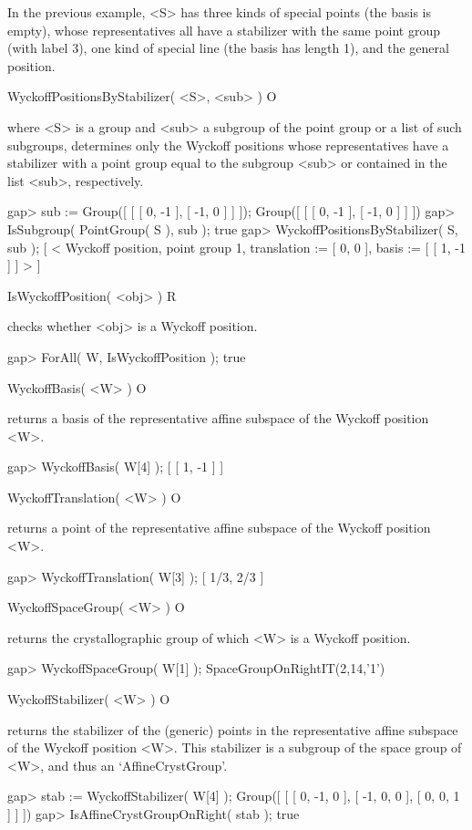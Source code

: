 In the previous example, <S> has three kinds of special points
(the basis is empty), whose representatives all have a stabilizer 
with the same point group (with label 3), one kind of special line
(the basis has length 1), and the general position.

\>WyckoffPositionsByStabilizer( <S>, <sub> ) O

where <S> is a group and <sub> a subgroup of the point group or
a list of such subgroups, determines only the Wyckoff positions whose
representatives have a stabilizer with a point group equal to the 
subgroup <sub> or contained in the list <sub>, respectively.

\beginexample
gap> sub := Group([ [ [ 0, -1 ], [ -1, 0 ] ] ]);
Group([ [ [ 0, -1 ], [ -1, 0 ] ] ])
gap> IsSubgroup( PointGroup( S ), sub );
true
gap> WyckoffPositionsByStabilizer( S, sub );
[ < Wyckoff position, point group 1, translation := [ 0, 0 ], 
    basis := [ [ 1, -1 ] ] >
     ]
\endexample

\>IsWyckoffPosition( <obj> ) R

checks whether <obj> is a Wyckoff position.

\beginexample
gap> ForAll( W, IsWyckoffPosition );
true
\endexample

\>WyckoffBasis( <W> ) O

returns a basis of the representative affine subspace of the Wyckoff 
position <W>.

\beginexample
gap> WyckoffBasis( W[4] );
[ [ 1, -1 ] ]
\endexample

\>WyckoffTranslation( <W> ) O

returns a point of the representative affine subspace of the Wyckoff 
position <W>.

\beginexample
gap> WyckoffTranslation( W[3] );
[ 1/3, 2/3 ]
\endexample

\>WyckoffSpaceGroup( <W> ) O

returns the crystallographic group of which <W> is a Wyckoff position.

\beginexample
gap> WyckoffSpaceGroup( W[1] );
SpaceGroupOnRightIT(2,14,'1')
\endexample

\>WyckoffStabilizer( <W> ) O

returns the stabilizer of the (generic) points in the representative
affine subspace of the Wyckoff position <W>. This stabilizer is a
subgroup of the space group of <W>, and thus an `AffineCrystGroup'.

\beginexample
gap> stab := WyckoffStabilizer( W[4] );
Group([ [ [ 0, -1, 0 ], [ -1, 0, 0 ], [ 0, 0, 1 ] ] ])
gap> IsAffineCrystGroupOnRight( stab );
true
\endexample

